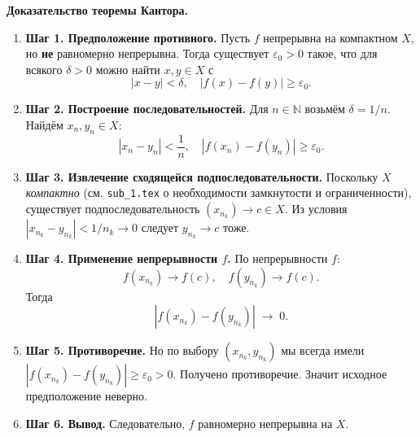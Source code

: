 \textbf{Доказательство теоремы Кантора.} 
\begin{enumerate}
  \item \textbf{Шаг 1. Предположение противного.}  
  Пусть $f$ непрерывна на компактном $X$, но \textbf{не} равномерно непрерывна. Тогда существует \(\varepsilon_0>0\) такое, что для всякого \(\delta>0\) можно найти $x,y\in X$ с
  \[
  |x-y|<\delta,\quad |f(x)-f(y)| \ge \varepsilon_0.
  \]

  \item \textbf{Шаг 2. Построение последовательностей.}  
  Для $n\in\mathbb{N}$ возьмём \(\delta=1/n\). Найдём $x_n,y_n \in X$:
  \[
    |x_n-y_n| < \frac{1}{n},\quad |f(x_n)-f(y_n)| \ge \varepsilon_0.
  \]

  \item \textbf{Шаг 3. Извлечение сходящейся подпоследовательности.}  
  Поскольку $X$ \emph{компактно} (см. \texttt{sub\_1.tex} о необходимости замкнутости и ограниченности), существует подпоследовательность $(x_{n_k})\to c\in X$. Из условия $|x_{n_k}-y_{n_k}|<1/{n_k}\to0$ следует $y_{n_k}\to c$ тоже.

  \item \textbf{Шаг 4. Применение непрерывности $f$.}  
  По непрерывности $f$:
  \[
    f(x_{n_k})\to f(c),\quad f(y_{n_k})\to f(c).
  \]
  Тогда
  \[
    |f(x_{n_k}) - f(y_{n_k})|\;\to\; 0.
  \]

  \item \textbf{Шаг 5. Противоречие.}  
  Но по выбору $(x_{n_k}, y_{n_k})$ мы всегда имели $|f(x_{n_k}) - f(y_{n_k})|\ge\varepsilon_0>0$. Получено противоречие. Значит исходное предположение неверно.

  \item \textbf{Шаг 6. Вывод.}  
  Следовательно, $f$ равномерно непрерывна на $X$.
\end{enumerate}

\medskip



